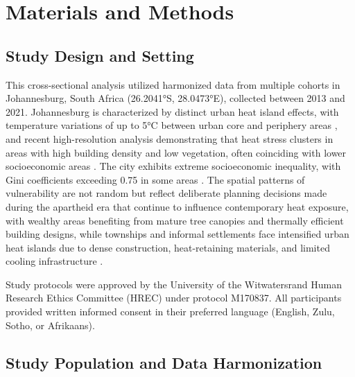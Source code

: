 \documentclass[11pt,a4paper]{article}
\begin{document}
\section{Materials and Methods}

\subsection{Study Design and Setting}

This cross-sectional analysis utilized harmonized data from multiple cohorts in Johannesburg, South Africa (26.2041°S, 28.0473°E), collected between 2013 and 2021. Johannesburg is characterized by distinct urban heat island effects, with temperature variations of up to 5°C between urban core and periphery areas \cite{jury2021johannesburg}, and recent high-resolution analysis demonstrating that heat stress clusters in areas with high building density and low vegetation, often coinciding with lower socioeconomic areas \cite{souverijns2022urban}. The city exhibits extreme socioeconomic inequality, with Gini coefficients exceeding 0.75 in some areas \cite{gcro2016quality}. The spatial patterns of vulnerability are not random but reflect deliberate planning decisions made during the apartheid era that continue to influence contemporary heat exposure, with wealthy areas benefiting from mature tree canopies and thermally efficient building designs, while townships and informal settlements face intensified urban heat islands due to dense construction, heat-retaining materials, and limited cooling infrastructure \cite{knox2017postapartheid,chen2024inequality}.

Study protocols were approved by the University of the Witwatersrand Human Research Ethics Committee (HREC) under protocol M170837. All participants provided written informed consent in their preferred language (English, Zulu, Sotho, or Afrikaans).

\subsection{Study Population and Data Harmonization}
\end{document}
